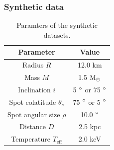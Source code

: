 \documentclass{beamer}
\def\msun{{\rm M_{\odot}}}
\def\thetas{\theta_{s}}
\begin{document}

\begin{frame}

\begin{center}
\frametitle{Synthetic data}
\begin{table}
  \caption{Paramters of the synthetic datasets.}
\label{table:params}
\begin{center}
  \begin{tabular}{| c | c |}
    \hline
     Parameter & Value\\ \hline
      Radius $R$ & 12.0 km  \\ \hline
      Mass $M$ & 1.5 $\msun$  \\ \hline
      Inclination $i$ & 5 $\degree$ or 75 $\degree$ \\ \hline
      Spot colatitude $\thetas$ & 75 $\degree$ or 5 $\degree$ \\ \hline
      Spot angular size $\rho$ & 10.0 $\degree$  \\ \hline
      Distance $D$ & 2.5 kpc \\ \hline
      Temperature $T_{\mathrm{eff}}$ & 2.0 keV \\

    \hline
  \end{tabular}
  \end{center} 

  \end{table}
\end{center}

\end{frame}
\end{document}
